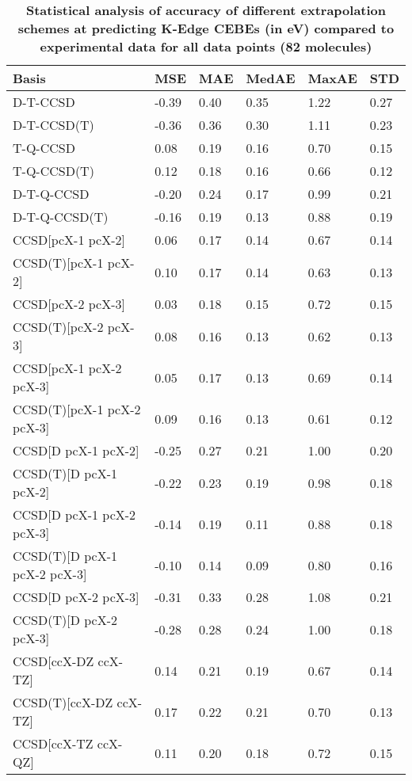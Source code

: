 \begin{table}
  \caption{\textbf{Statistical analysis of accuracy of different extrapolation schemes at predicting K-Edge CEBEs (in eV) compared to experimental data for all data points (82 molecules)}}
  \begin{tabular}{l l l l l l }
    \toprule
    \textbf{Basis} & \textbf{MSE} & \textbf{MAE} & \textbf{MedAE} & \textbf{MaxAE} & \textbf{STD} \\ 
    \midrule
    D-T-CCSD & -0.39 & 0.40 & 0.35 & 1.22 & 0.27 \\ 
    D-T-CCSD(T) & -0.36 & 0.36 & 0.30 & 1.11 & 0.23 \\ 
    T-Q-CCSD & 0.08 & 0.19 & 0.16 & 0.70 & 0.15 \\ 
    T-Q-CCSD(T) & 0.12 & 0.18 & 0.16 & 0.66 & 0.12 \\ 
    D-T-Q-CCSD & -0.20 & 0.24 & 0.17 & 0.99 & 0.21 \\ 
    D-T-Q-CCSD(T) & -0.16 & 0.19 & 0.13 & 0.88 & 0.19 \\ 
    CCSD[pcX-1 pcX-2] & 0.06 & 0.17 & 0.14 & 0.67 & 0.14 \\ 
    CCSD(T)[pcX-1 pcX-2] & 0.10 & 0.17 & 0.14 & 0.63 & 0.13 \\ 
    CCSD[pcX-2 pcX-3] & 0.03 & 0.18 & 0.15 & 0.72 & 0.15 \\ 
    CCSD(T)[pcX-2 pcX-3] & 0.08 & 0.16 & 0.13 & 0.62 & 0.13 \\ 
    CCSD[pcX-1 pcX-2 pcX-3] & 0.05 & 0.17 & 0.13 & 0.69 & 0.14 \\ 
    CCSD(T)[pcX-1 pcX-2 pcX-3] & 0.09 & 0.16 & 0.13 & 0.61 & 0.12 \\ 
    CCSD[D pcX-1 pcX-2] & -0.25 & 0.27 & 0.21 & 1.00 & 0.20 \\ 
    CCSD(T)[D pcX-1 pcX-2] & -0.22 & 0.23 & 0.19 & 0.98 & 0.18 \\ 
    CCSD[D pcX-1 pcX-2 pcX-3] & -0.14 & 0.19 & 0.11 & 0.88 & 0.18 \\ 
    CCSD(T)[D pcX-1 pcX-2 pcX-3] & -0.10 & 0.14 & 0.09 & 0.80 & 0.16 \\ 
    CCSD[D pcX-2 pcX-3] & -0.31 & 0.33 & 0.28 & 1.08 & 0.21 \\ 
    CCSD(T)[D pcX-2 pcX-3] & -0.28 & 0.28 & 0.24 & 1.00 & 0.18 \\ 
    CCSD[ccX-DZ ccX-TZ] & 0.14 & 0.21 & 0.19 & 0.67 & 0.14 \\ 
    CCSD(T)[ccX-DZ ccX-TZ] & 0.17 & 0.22 & 0.21 & 0.70 & 0.13 \\ 
    CCSD[ccX-TZ ccX-QZ] & 0.11 & 0.20 & 0.18 & 0.72 & 0.15 \\ 

\end{tabular}
\end{table}
